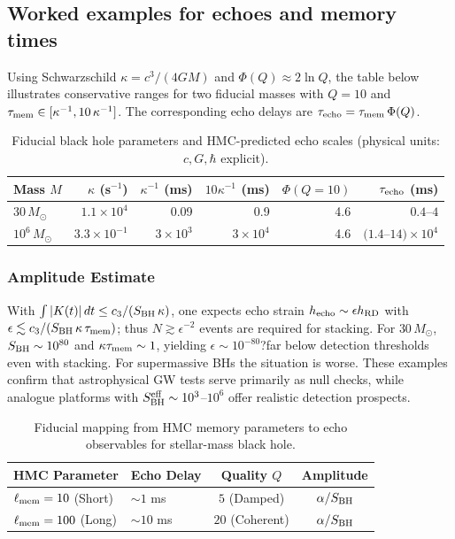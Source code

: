 \documentclass[11pt,a4paper]{article}
\newcommand{\HMC}{\textsc{HMC}\xspace}
\theoremstyle{plain}
\theoremstyle{definition}
\theoremstyle{remark}
\begin{document}
\subsection*{Worked examples for echoes and memory times}
Using Schwarzschild $\kappa=c^3/(4GM)$ and $\Phi(Q)\approx 2\ln Q$, the table below illustrates
conservative ranges for two fiducial masses with $Q=10$ and $\tau_{\rm mem}\in[\kappa^{-1},10\,\kappa^{-1}]$.
The corresponding echo delays are $\tau_{\rm echo}=\tau_{\rm mem}\,\Phi(Q)$.
\begin{table}[htbp]
\centering
\caption{Fiducial black hole parameters and \HMC{}-predicted echo scales (physical units: $c,G,\hbar$ explicit).}
\label{tab:echo-worked-examples}
\footnotesize
\begin{tabular}{lrrrrr}
\toprule
\textbf{Mass $M$} & \textbf{$\kappa$ (s$^{-1}$)} & \textbf{$\kappa^{-1}$ (ms)} & \textbf{$10\kappa^{-1}$ (ms)} & \textbf{$\Phi(Q{=}10)$} & \textbf{$\tau_{\rm echo}$ (ms)} \\
\midrule
$30\,M_\odot$ & $1.1\times 10^4$ & 0.09 & 0.9 & 4.6 & $0.4$--$4$ \\
$10^6\,M_\odot$ & $3.3\times 10^{-1}$ & $3\times 10^3$ & $3\times 10^4$ & 4.6 & $(1.4$--$14)\times 10^4$ \\
\bottomrule
\end{tabular}
\end{table}
\subsubsection{Amplitude Estimate}
With $\int |K(t)|\,dt\le c_3/(S_{\rm BH}\,\kappa)$, one expects echo strain $h_{\rm echo}\sim \epsilon h_{\rm RD}$ with
$\epsilon\lesssim c_3/(S_{\rm BH}\,\kappa\,\tau_{\rm mem})$; thus $N\gtrsim \epsilon^{-2}$ events are required for stacking.
For $30\,M_\odot$, $S_{\rm BH}\sim 10^{80}$ and $\kappa\tau_{\rm mem}\sim 1$, yielding $\epsilon\sim 10^{-80}$?far below detection thresholds even with stacking. For supermassive BHs the situation is worse. These examples confirm that astrophysical GW tests serve primarily as null checks, while analogue platforms with $S_{\rm BH}^{\rm eff}\sim 10^3$--$10^6$ offer realistic detection prospects.

\begin{table}[htbp]
\centering
\caption{Fiducial mapping from \HMC{} memory parameters to echo observables for stellar-mass black hole.}
\label{tab:echo_mapping}
\small
\begin{tabular}{@{}llcc@{}}
\toprule
\textbf{\HMC{} Parameter} & \textbf{Echo Delay} & \textbf{Quality $Q$} & \textbf{Amplitude} \\
\midrule
$\ell_{\rm mem}=10$ (Short) & $\sim 1$ ms & $5$ (Damped) & $\alpha/S_{\rm BH}$ \\
$\ell_{\rm mem}=100$ (Long) & $\sim 10$ ms & $20$ (Coherent) & $\alpha/S_{\rm BH}$ \\
\bottomrule
\end{tabular}
\end{table}
\end{document}
